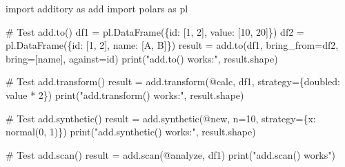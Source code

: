 \documentclass[
  letterpaper,
]{scrbook}
\newenvironment{Shaded}{\begin{snugshade}}{\end{snugshade}}
\newcommand{\BuiltInTok}[1]{\textcolor[rgb]{0.00,0.23,0.31}{#1}}
\newcommand{\CommentTok}[1]{\textcolor[rgb]{0.37,0.37,0.37}{#1}}
\newcommand{\DecValTok}[1]{\textcolor[rgb]{0.68,0.00,0.00}{#1}}
\newcommand{\ImportTok}[1]{\textcolor[rgb]{0.00,0.46,0.62}{#1}}
\newcommand{\NormalTok}[1]{\textcolor[rgb]{0.00,0.23,0.31}{#1}}
\newcommand{\OperatorTok}[1]{\textcolor[rgb]{0.37,0.37,0.37}{#1}}
\newcommand{\StringTok}[1]{\textcolor[rgb]{0.13,0.47,0.30}{#1}}
\begin{document}
\begin{Shaded}
\begin{Highlighting}[]
\ImportTok{import}\NormalTok{ additory }\ImportTok{as}\NormalTok{ add}
\ImportTok{import}\NormalTok{ polars }\ImportTok{as}\NormalTok{ pl}

\CommentTok{\# Test add.to()}
\NormalTok{df1 }\OperatorTok{=}\NormalTok{ pl.DataFrame(\{}\StringTok{\textquotesingle{}id\textquotesingle{}}\NormalTok{: [}\DecValTok{1}\NormalTok{, }\DecValTok{2}\NormalTok{], }\StringTok{\textquotesingle{}value\textquotesingle{}}\NormalTok{: [}\DecValTok{10}\NormalTok{, }\DecValTok{20}\NormalTok{]\})}
\NormalTok{df2 }\OperatorTok{=}\NormalTok{ pl.DataFrame(\{}\StringTok{\textquotesingle{}id\textquotesingle{}}\NormalTok{: [}\DecValTok{1}\NormalTok{, }\DecValTok{2}\NormalTok{], }\StringTok{\textquotesingle{}name\textquotesingle{}}\NormalTok{: [}\StringTok{\textquotesingle{}A\textquotesingle{}}\NormalTok{, }\StringTok{\textquotesingle{}B\textquotesingle{}}\NormalTok{]\})}
\NormalTok{result }\OperatorTok{=}\NormalTok{ add.to(df1, bring\_from}\OperatorTok{=}\NormalTok{df2, bring}\OperatorTok{=}\NormalTok{[}\StringTok{\textquotesingle{}name\textquotesingle{}}\NormalTok{], against}\OperatorTok{=}\StringTok{\textquotesingle{}id\textquotesingle{}}\NormalTok{)}
\BuiltInTok{print}\NormalTok{(}\StringTok{"add.to() works:"}\NormalTok{, result.shape)}

\CommentTok{\# Test add.transform()}
\NormalTok{result }\OperatorTok{=}\NormalTok{ add.transform(}\StringTok{\textquotesingle{}@calc\textquotesingle{}}\NormalTok{, df1, strategy}\OperatorTok{=}\NormalTok{\{}\StringTok{\textquotesingle{}doubled\textquotesingle{}}\NormalTok{: }\StringTok{\textquotesingle{}value * 2\textquotesingle{}}\NormalTok{\})}
\BuiltInTok{print}\NormalTok{(}\StringTok{"add.transform() works:"}\NormalTok{, result.shape)}

\CommentTok{\# Test add.synthetic()}
\NormalTok{result }\OperatorTok{=}\NormalTok{ add.synthetic(}\StringTok{\textquotesingle{}@new\textquotesingle{}}\NormalTok{, n}\OperatorTok{=}\DecValTok{10}\NormalTok{, strategy}\OperatorTok{=}\NormalTok{\{}\StringTok{\textquotesingle{}x\textquotesingle{}}\NormalTok{: }\StringTok{\textquotesingle{}normal(0, 1)\textquotesingle{}}\NormalTok{\})}
\BuiltInTok{print}\NormalTok{(}\StringTok{"add.synthetic() works:"}\NormalTok{, result.shape)}

\CommentTok{\# Test add.scan()}
\NormalTok{result }\OperatorTok{=}\NormalTok{ add.scan(}\StringTok{\textquotesingle{}@analyze\textquotesingle{}}\NormalTok{, df1)}
\BuiltInTok{print}\NormalTok{(}\StringTok{"add.scan() works"}\NormalTok{)}
\end{Highlighting}
\end{Shaded}
\end{document}
